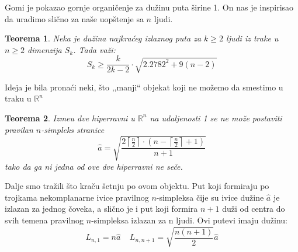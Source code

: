 \documentclass[b1paper,portrait]{template/baposter}
\newtheorem{theorem}{Teorema}
\begin{document}
\begin{poster}
{
	Gomi je pokazao gornje organi\v cenje za du\v zinu puta \v sirine 1.
	On nas je inspirisao da uradimo sli\v cno za na\v se uop\v stenje sa $n$ ljudi.
	\begin{theorem}
		Neka je du\v zina najkra\' ceg izlaznog puta za $k\geqslant 2$ ljudi iz trake u $n\geqslant 2$ dimenzija $S_k$. Tada va\v zi:
		$$S_k\geqslant\frac{k}{2k-2}\cdot \sqrt{2.2782^2+9(n-2)}$$
	\end{theorem}
	\vspace{0.2cm}
}



{
 	Ideja je bila  prona\' ci neki, \v sto ,,manji`` objekat koji ne mo\v zemo da smestimo u traku u $\mathbb{R}^n$
 	\begin{theorem}
 		Izme\dj u dve hiperravni u $\mathbb{R}^n$ na udaljenosti 1 se ne mo\v ze postaviti pravilan $n$-simpleks stranice
 		$$\hat{a} = \sqrt{\frac{2\left\lceil \frac{n}{2}\right\rceil\cdot \left( n-\left\lceil\frac{n}{2}\right\rceil+1\right)}{n+1}}$$
 		tako da ga ni jedna od ove dve hiperravni ne se\v ce. 
 	\end{theorem}
 	Dalje smo tra\v zili \v sto kra\v cu \v setnju po ovom objektu.
 	Put koji formiraju po trojkama nekomplanarne ivice pravilnog $n$-simpleksa \v cije su ivice du\v zine $\hat{a}$
 	je izlazan za jednog \v coveka, a sli\v cno je i put koji formira $n+1$ du\v zi 
 	od centra do svih temena pravilnog $n$-simpleksa  izlazan za n ljudi. Ovi putevi imaju du\v zinu:
	$$L_{n,1}=n\hat{a} \ \ \ \ \  L_{n, n+1}=\sqrt{\frac{n(n+1)}{2}}\hat{a}$$
 	\begin{center}
 		

\end{center}}
\end{poster}
\end{document}
